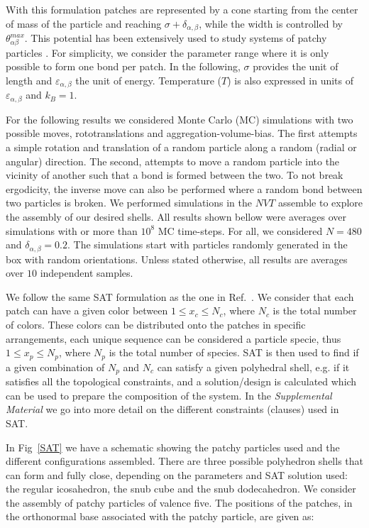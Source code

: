 \documentclass[a4paper, amsfonts, amssymb, amsmath, reprint, showkeys, nofootinbib, twoside]{revtex4-1}
\begin{document}
With this formulation patches are represented by a cone starting from the center of mass of the particle and reaching $\sigma + \delta_{\alpha,\beta}$, while the width is controlled by $\theta^{max}_{\alpha \beta}$. This potential has been extensively used to study systems of patchy particles \cite{Rovigatti2018}. For simplicity, we consider the parameter range where it is only possible to form one bond per patch. In the following, $\sigma$ provides the unit of length and $\varepsilon_{\alpha, \beta}$ the unit of energy. Temperature ($T$) is also expressed in units of $\varepsilon_{\alpha, \beta}$ and $k_B=1$.

For the following results we considered Monte Carlo (MC) simulations with two possible moves, rototranslations and aggregation-volume-bias. The first attempts a simple rotation and translation of a random particle along a random (radial or angular) direction. The second, attempts to move a random particle into the vicinity of another such that a bond is formed between the two. To not break ergodicity, the inverse move can also be performed where a random bond between two particles is broken. We performed simulations in the $NVT$ assemble to explore the assembly of our desired shells. All results shown bellow were averages over simulations with or more than $10^8$ MC time-steps. For all, we considered $N=480$ and $\delta_{\alpha, \beta}=0.2$. The simulations start with particles randomly generated in the box with random orientations. Unless stated otherwise, all results are averages over $10$ independent samples.

We follow the same SAT formulation as the one in Ref.~\cite{Russo2021}. We consider that each patch can have a given color between $1\leq x_c\leq N_c$, where $N_c$ is the total number of colors. These colors can be distributed onto the patches in specific arrangements, each unique sequence can be considered a particle specie, thus $1\leq x_p\leq N_p$, where $N_p$ is the total number of species. SAT is then used to find if a given combination of $N_p$ and $N_c$ can satisfy a given polyhedral shell, e.g. if it satisfies all the topological constraints, and a solution/design is calculated which can be used to prepare the composition of the system. In the \emph{Supplemental Material} we go into more detail on the different constraints (clauses) used in SAT.

In Fig~\ref{SAT} we have a schematic showing the patchy particles used and the different configurations assembled. There are three possible polyhedron shells that can form and fully close, depending on the parameters and SAT solution used: the regular icosahedron, the snub cube and the snub dodecahedron. We consider the assembly of patchy particles of valence five. The positions of the patches, in the orthonormal base associated with the patchy particle, are given as:
\end{document}
